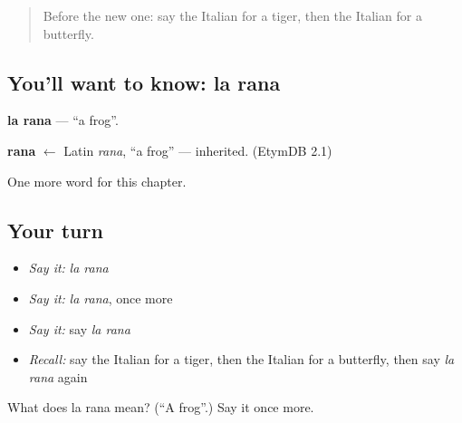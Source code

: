 \begin{quote}
Before the new one: say the Italian for a tiger, then the Italian for a butterfly.
\end{quote}

\subsection*{You'll want to know: la rana}
\textbf{la rana} — \textquotedblleft{}a frog\textquotedblright{}.

\begin{cousinweb}
\textbf{rana} $\leftarrow$ Latin \emph{rana}, \textquotedblleft{}a frog\textquotedblright{} — inherited. (EtymDB 2.1)
\end{cousinweb}

\begin{grammarlens}[title={What you've built}]
One more word for this chapter.
\end{grammarlens}

\subsection*{Your turn}
\begin{itemize}
\raggedright
  \item \emph{Say it:} \emph{la rana}
  \item \emph{Say it:} \emph{la rana}, once more
  \item \emph{Say it:} say \emph{la rana}
  \item \emph{Recall:} say the Italian for a tiger, then the Italian for a butterfly, then say \emph{la rana} again
\end{itemize}

\begin{tcolorbox}[breakable,colback=teal!4,colframe=teal!35!black,title={Before you move on}]
What does la rana mean? (\textquotedblleft{}A frog\textquotedblright{}.) Say it once more.
\end{tcolorbox}
